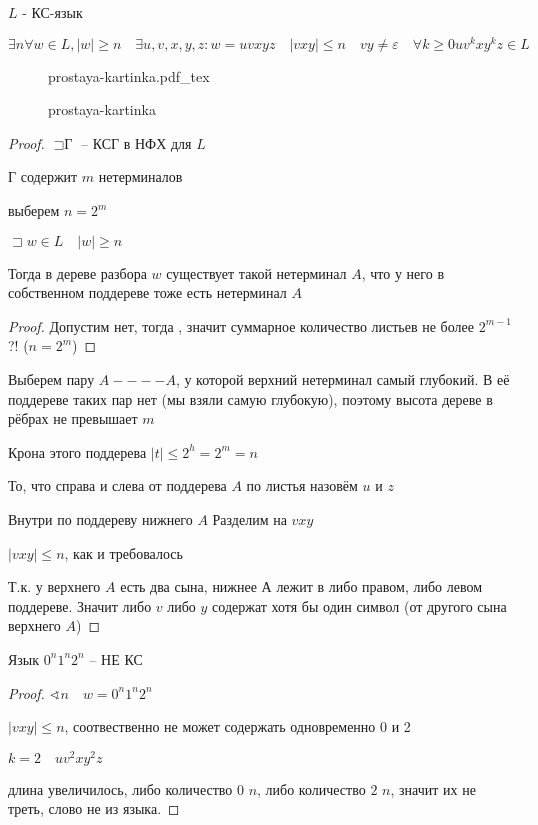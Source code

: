 \documentclass{book}
\theoremstyle{definition}
\newcommand{\incfig}[1]{%
    \def\svgwidth{\columnwidth}
    {#1.pdf_tex}
}
\begin{document}
    \begin{theorem}

        $L$ - КС-язык

         $\exists n  \forall w\in L, |w| \geqslant n\quad \exists u, v, x, y, z: w = uvxyz\quad |vxy| \leqslant n \quad vy\neq \varepsilon\quad  \forall  k\geqslant 0 uv^kxy^kz\in L$
    \end{theorem}

\begin{figure}[!ht]
    \centering
    \incfig{prostaya-kartinka}
    \caption{prostaya-kartinka}
    \label{fig:prostaya-kartinka}
\end{figure}


\begin{proof}
    $\sqsupset \text{Г}$ -- КСГ в НФХ для $L$

    Г содержит  $m$ нетерминалов

    выберем  $n = 2^m$

     \begin{lemma}
        $\sqsupset w\in L\quad |w| \geqslant n$

        Тогда в дереве разбора $w$ существует такой нетерминал  $A$, что у него в собственном поддереве тоже есть нетерминал  $A$
    \end{lemma}
    \begin{proof}
        Допустим нет, тогда , значит суммарное количество листьев не более $2^{m-1}$?! ($n = 2^m$) 
    \end{proof}

    Выберем пару $A ---- A$, у которой верхний нетерминал самый глубокий. В её поддереве таких пар нет (мы взяли самую глубокую), поэтому высота дереве в рёбрах не превышает  $m$

    Крона этого поддерева  $|t| \leqslant  2^h = 2^m = n$ 

    То, что справа и слева от поддерева $A$ по листья назовём  $u$ и  $z$

    Внутри по поддереву нижнего  $A$ Разделим на  $vxy$

     $|vxy| \leqslant n$, как и требовалось

     Т.к. у верхнего $A$ есть два сына, нижнее А лежит в либо правом, либо левом поддереве. Значит либо  $v$ либо  $y$ содержат хотя бы один символ (от другого сына верхнего  $A$)
\end{proof}

\begin{theorem}
    Язык $0^n 1^n 2^n$ -- НЕ КС
\end{theorem}
\begin{proof}
    $\sphericalangle n\quad w = 0^n 1^n 2^n$

    $|vxy| \leqslant n$, соотвественно не может содержать одновременно 0 и 2

    $k = 2\quad uv^2xy^2z$

    длина увеличилось, либо количество 0 $n$, либо количество  $2$  $n$, значит их не треть, слово не из языка.
\end{proof}
\end{document}
